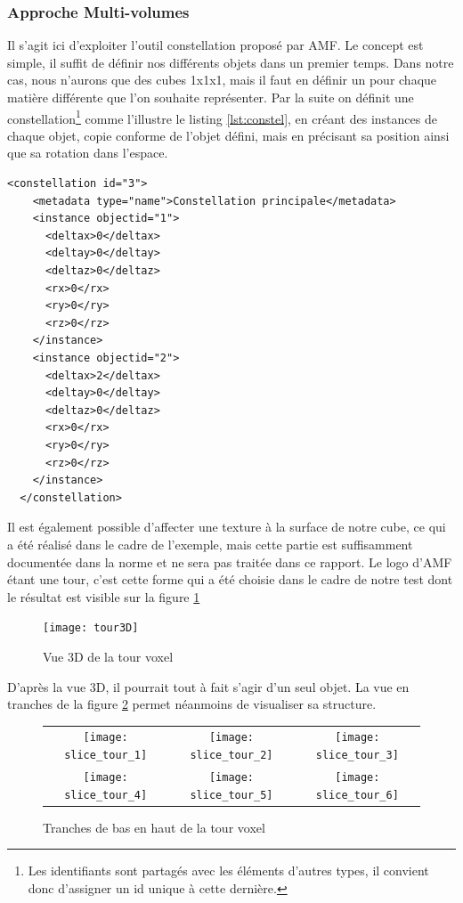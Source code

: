 \documentclass{tnreport}
\begin{document}
\subsubsection{Approche Multi-volumes}
 Il s'agit ici d'exploiter l'outil constellation proposé par AMF. Le concept est simple, il suffit de définir nos différents objets dans un premier temps. Dans notre cas, nous n'aurons que des cubes 1x1x1, mais il faut en définir un pour chaque matière différente que l'on souhaite représenter. Par la suite on définit une constellation\footnote{Les identifiants sont partagés avec les éléments d'autres types, il convient donc d'assigner un id unique à cette dernière.} comme l'illustre le listing \ref{lst:constel}, en créant des instances de chaque objet, copie conforme de l'objet défini, mais en précisant sa position ainsi que sa rotation dans l'espace.
 
\begin{lstlisting}[language=AMF,label={lst:constel},caption={syntaxe d'utilisation d'une constellation}]
  <constellation id="3">
    <metadata type="name">Constellation principale</metadata>
    <instance objectid="1">
      <deltax>0</deltax>
      <deltay>0</deltay>
      <deltaz>0</deltaz>
      <rx>0</rx>
      <ry>0</ry>
      <rz>0</rz>
    </instance>
    <instance objectid="2">
      <deltax>2</deltax>
      <deltay>0</deltay>
      <deltaz>0</deltaz>
      <rx>0</rx>
      <ry>0</ry>
      <rz>0</rz>
    </instance>
  </constellation>
\end{lstlisting}

Il est également possible d'affecter une texture à la surface de notre cube, ce qui a été réalisé dans le cadre de l'exemple, mais cette partie est suffisamment documentée dans la norme\cite{astmAMF} et ne sera pas traitée dans ce rapport. Le logo d'AMF étant une tour, c'est cette forme qui a été choisie dans le cadre de notre test dont le résultat est visible sur la figure \ref{fig:tourvox}
\begin{figure}[h]
  \centering
  \texttt{[image: tour3D]}
  \caption{Vue 3D de la tour voxel}
  \label{fig:tourvox}
\end{figure}

D'après la vue 3D, il pourrait tout à fait s'agir d'un seul objet. La vue en tranches de la figure \ref{fig:slicetourvox} permet néanmoins de visualiser sa structure.
\begin{figure}[htb]
\centering
  \begin{tabular}{@{}ccc@{}}
    \texttt{[image: slice\_tour\_1]} &
    \texttt{[image: slice\_tour\_2]} &
    \texttt{[image: slice\_tour\_3]} \\
    \texttt{[image: slice\_tour\_4]} &
    \texttt{[image: slice\_tour\_5]} &
    \texttt{[image: slice\_tour\_6]} \\
  \end{tabular}
  \caption{Tranches de bas en haut de la tour voxel}
  \label{fig:slicetourvox}
\end{figure}
\end{document}
